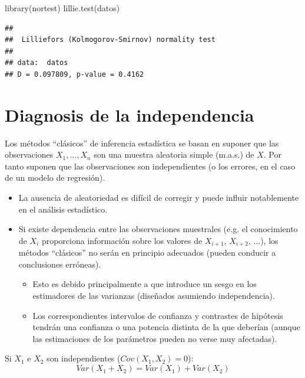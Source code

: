 \documentclass[
]{book}
\newenvironment{Shaded}{\begin{snugshade}}{\end{snugshade}}
\newcommand{\FunctionTok}[1]{\textcolor[rgb]{0.00,0.00,0.00}{#1}}
\newcommand{\NormalTok}[1]{#1}
\theoremstyle{break}
\theoremstyle{definition}
\theoremstyle{definition}
\theoremstyle{definition}
\theoremstyle{definition}
\theoremstyle{remark}
\begin{document}
\begin{Shaded}
\begin{Highlighting}[]
\FunctionTok{library}\NormalTok{(nortest)}
\FunctionTok{lillie.test}\NormalTok{(datos)}
\end{Highlighting}
\end{Shaded}

\begin{verbatim}
## 
##  Lilliefors (Kolmogorov-Smirnov) normality test
## 
## data:  datos
## D = 0.097809, p-value = 0.4162
\end{verbatim}

\hypertarget{diag-aleat}{%
\section{Diagnosis de la independencia}\label{diag-aleat}}

Los métodos ``clásicos'' de inferencia estadística se basan en
suponer que las observaciones \(X_{1},\ldots,X_{n}\) son una muestra
aleatoria simple (m.a.s.) de \(X\). Por tanto suponen que
las observaciones son independientes (o los errores, en el caso de un
modelo de regresión).

\begin{itemize}
\item
  La ausencia de aleatoriedad es difícil de corregir y puede influir
  notablemente en el análisis estadístico.
\item
  Si existe dependencia entre las observaciones muestrales (e.g.
  el conocimiento de \(X_{i}\) proporciona información sobre los valores
  de \(X_{i+1}\), \(X_{i+2}\), \(\ldots\)), los métodos ``clásicos'' no serán
  en principio adecuados (pueden conducir a conclusiones erróneas).

  \begin{itemize}
  \item
    Esto es debido principalmente a que introduce un sesgo en los
    estimadores de las varianzas (diseñados asumiendo independencia).
  \item
    Los correspondientes intervalos de confianza y
    contrastes de hipótesis tendrán una confianza o una potencia
    distinta de la que deberían (aunque las estimaciones de los parámetros
    pueden no verse muy afectadas).
  \end{itemize}
\end{itemize}

Si \(X_{1}\) e \(X_{2}\) son independientes (\(Cov(X_{1},X_{2})=0\)):
\[Var(X_{1}+X_{2})=Var(X_{1})+Var(X_{2})\]
\end{document}
